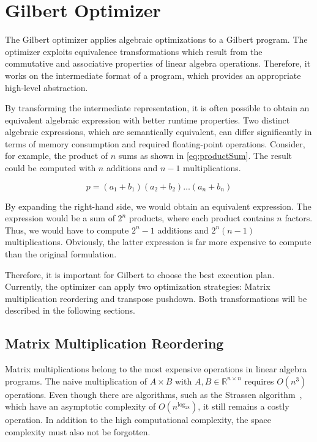 \chapter{Gilbert Optimizer}
\label{cha:optimizer}


The Gilbert optimizer applies algebraic optimizations to a Gilbert program.
The optimizer exploits equivalence transformations which result from the commutative and associative properties of linear algebra operations.
Therefore, it works on the intermediate format of a program, which provides an appropriate high-level abstraction.

By transforming the intermediate representation, it is often possible to obtain an equivalent algebraic expression with better runtime properties.
Two distinct algebraic expressions, which are semantically equivalent, can differ significantly in terms of memory consumption and required floating-point operations.
Consider, for example, the product of $n$ sums as shown in \cref{eq:productSum}.
The result could be computed with $n$ additions and $n-1$ multiplications.

\begin{equation}
	p = (a_1 + b_1)(a_2 + b_2)\ldots(a_n + b_n) \label{eq:productSum}
\end{equation}

By expanding the right-hand side, we would obtain an equivalent expression.
The expression would be a sum of $2^n$ products, where each product contains $n$ factors.
Thus, we would have to compute $2^n-1$ additions and $2^n(n-1)$ multiplications.
Obviously, the latter expression is far more expensive to compute than the original formulation.

Therefore, it is important for Gilbert to choose the best execution plan.
Currently, the optimizer can apply two optimization strategies: Matrix multiplication reordering and transpose pushdown.
Both transformations will be described in the following sections.

\section{Matrix Multiplication Reordering}

Matrix multiplications belong to the most expensive operations in linear algebra programs.
The naive multiplication of $A\times B$ with $A,B \in \mathbb{R}^{n \times n}$ requires $O(n^3)$ operations.
Even though there are algorithms, such as the Strassen algorithm~\cite{strassen:nm1969a}, which have an asymptotic complexity of $O(n^{\log_28})$, it still remains a costly operation.
In addition to the high computational complexity, the space complexity must also not be forgotten.

